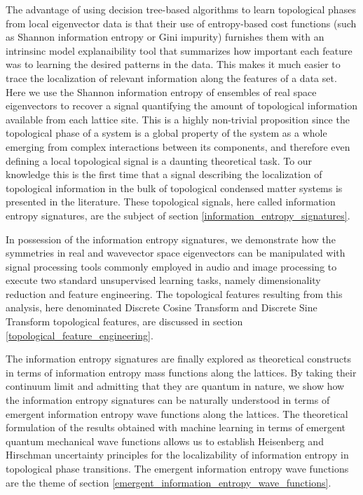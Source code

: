 \documentclass[10pt]{revtex4-1}
\begin{document}
The advantage of using decision tree-based algorithms to learn topological phases from local eigenvector data is that their use of entropy-based cost functions (such as Shannon information entropy or Gini impurity) furnishes them with an intrinsinc model explanaibility tool that summarizes how important each feature was to learning the desired patterns in the data. This makes it much easier to trace the localization of relevant information along the features of a data set. Here we use the Shannon information entropy of ensembles of real space eigenvectors to recover a signal quantifying the amount of topological information available from each lattice site. This is a highly non-trivial proposition since the topological phase of a system is a global property of the system as a whole emerging from complex interactions between its components, and therefore even defining a local topological signal is a daunting theoretical task. To our knowledge this is the first time that a signal describing the localization of topological information in the bulk of topological condensed matter systems is presented in the literature. These topological signals, here called information entropy signatures, are the subject of section \ref{information_entropy_signatures}. 

In possession of the information entropy signatures, we demonstrate how the symmetries in real and wavevector space eigenvectors can be manipulated with signal processing tools commonly employed in audio and image processing to execute two standard unsupervised learning tasks, namely dimensionality reduction and feature engineering. The topological features resulting from this analysis, here denominated Discrete Cosine Transform and Discrete Sine Transform topological features, are discussed in section \ref{topological_feature_engineering}.    

The information entropy signatures are finally explored as theoretical constructs in terms of information entropy mass functions along the lattices. By taking their continuum limit and admitting that they are quantum in nature, we show how the information entropy signatures can be naturally understood in terms of emergent information entropy wave functions along the lattices. The theoretical formulation of the results obtained with machine learning in terms of emergent quantum mechanical wave functions allows us to establish Heisenberg and Hirschman uncertainty principles for the localizability of information entropy in topological phase transitions. The emergent information entropy wave functions are the theme of section \ref{emergent_information_entropy_wave_functions}.      
\end{document}
